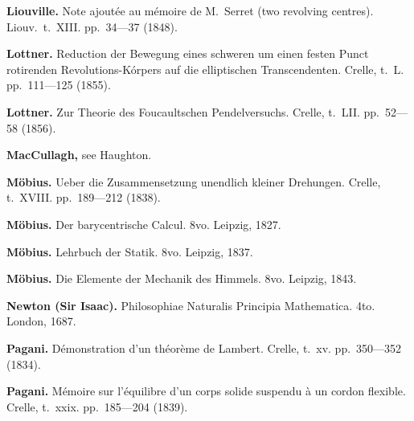 \documentclass[12pt,a4paper]{article}
\theoremstyle{definition}
\begin{document}
\vspace{0.5em}

\noindent\textbf{Liouville.} Note ajout\'{e}e au m\'{e}moire de M.~Serret (two revolving centres). Liouv.~t.~XIII. pp.~34---37 (1848).

\vspace{0.5em}

\noindent\textbf{Lottner.} Reduction der Bewegung eines schweren um einen festen Punct rotirenden Revolutions-K\'{o}rpers auf die elliptischen Transcendenten. Crelle, t.~L. pp.~111---125 (1855).

\vspace{0.5em}

\noindent\textbf{Lottner.} Zur Theorie des Foucaultschen Pendelversuchs. Crelle, t.~LII. pp.~52---58 (1856).

\vspace{0.5em}

\noindent\textbf{MacCullagh,} see Haughton.

\vspace{0.5em}

\noindent\textbf{M\"{o}bius.} Ueber die Zusammensetzung unendlich kleiner Drehungen. Crelle, t.~XVIII. pp.~189---212 (1838).

\vspace{0.5em}

\noindent\textbf{M\"{o}bius.} Der barycentrische Calcul. 8vo. Leipzig, 1827.

\vspace{0.5em}

\noindent\textbf{M\"{o}bius.} Lehrbuch der Statik. 8vo. Leipzig, 1837.

\vspace{0.5em}

\noindent\textbf{M\"{o}bius.} Die Elemente der Mechanik des Himmels. 8vo. Leipzig, 1843.

\vspace{0.5em}

\noindent\textbf{Newton (Sir Isaac).} Philosophiae Naturalis Principia Mathematica. 4to. London, 1687.

\vspace{0.5em}

\noindent\textbf{Pagani.} D\'{e}monstration d'un th\'{e}or\`{e}me de Lambert. Crelle, t.~xv. pp.~350---352 (1834).

\vspace{0.5em}

\noindent\textbf{Pagani.} M\'{e}moire sur l'\'{e}quilibre d'un corps solide suspendu \`{a} un cordon flexible. Crelle, t.~xxix. pp.~185---204 (1839).
\end{document}

